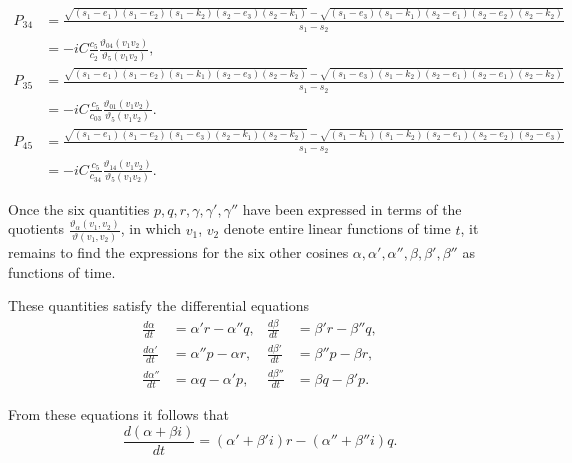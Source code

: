 \documentclass{article}
\begin{document}
\begin{align*}
P_{34} &= \frac{\sqrt{(s_1 - e_1)(s_1 - e_2)(s_1 - k_2)(s_2 - e_3)(s_2 - k_1)} - \sqrt{(s_1 - e_3)(s_1 - k_1)(s_2 - e_1)(s_2 - e_2)(s_2 - k_2)}}{s_1 - s_2} \\
&= -iC\frac{c_5}{c_2}\frac{\vartheta_{04}(v_1v_2)}{\vartheta_5(v_1v_2)},
\end{align*}
\begin{align*}
P_{35} &= \frac{\sqrt{(s_1 - e_1)(s_1 - e_2)(s_1 - k_1)(s_2 - e_3)(s_2 - k_2)} - \sqrt{(s_1 - e_3)(s_1 - k_2)(s_2 - e_1)(s_2 - e_1)(s_2 - k_2)}}{s_1 - s_2} \label{eq:P35} \\
&= -iC\frac{c_5}{c_{03}}\frac{\vartheta_{01}(v_1v_2)}{\vartheta_5(v_1v_2)}.
\end{align*}
\begin{align*}
P_{45} &= \frac{\sqrt{(s_1 - e_1)(s_1 - e_2)(s_1 - e_3)(s_2 - k_1)(s_2 - k_2)} - \sqrt{(s_1 - k_1)(s_1 - k_2)(s_2 - e_1)(s_2 - e_2)(s_2 - e_3)}}{s_1 - s_2} \\
&= -iC\frac{c_5}{c_{34}}\frac{\vartheta_{14}(v_1v_2)}{\vartheta_5(v_1v_2)}.
\end{align*}

Once the six quantities $p, q, r, \gamma, \gamma', \gamma''$ have been expressed in terms of the quotients $\frac{\vartheta_\alpha(v_1, v_2)}{\vartheta(v_1, v_2)}$, in which $v_1$, $v_2$ denote entire linear functions of time $t$, it remains to find the expressions for the six other cosines $\alpha, \alpha', \alpha'', \beta, \beta', \beta''$ as functions of time.

These quantities satisfy the differential equations
\begin{align*}
\frac{d\alpha}{dt} &= \alpha'r - \alpha''q, & \frac{d\beta}{dt} &= \beta'r - \beta''q, \\
\frac{d\alpha'}{dt} &= \alpha''p - \alpha r, & \frac{d\beta'}{dt} &= \beta''p - \beta r, \\
\frac{d\alpha''}{dt} &= \alpha q - \alpha'p, & \frac{d\beta''}{dt} &= \beta q - \beta'p.
\end{align*}

From these equations it follows that
\[
\frac{d(\alpha + \beta i)}{dt} = (\alpha' + \beta'i)r - (\alpha'' + \beta''i)q.
\]
\end{document}
